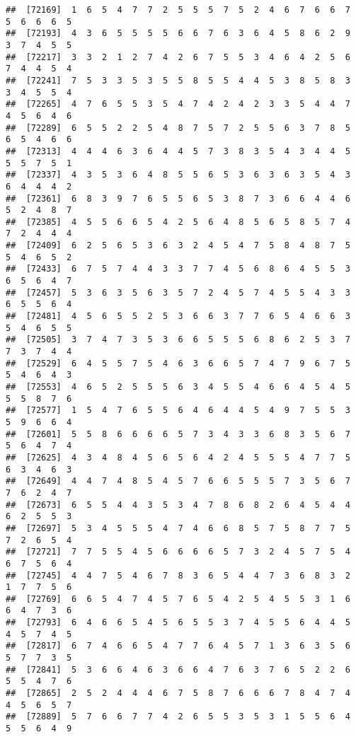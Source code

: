 \documentclass[
]{book}
\begin{document}
\begin{verbatim}
##  [72169]  1  6  5  4  7  7  2  5  5  5  7  5  2  4  6  7  6  6  7  5  6  6  6  5
##  [72193]  4  3  6  5  5  5  5  6  6  7  6  3  6  4  5  8  6  2  9  3  7  4  5  5
##  [72217]  3  3  2  1  2  7  4  2  6  7  5  5  3  4  6  4  2  5  6  7  4  4  5  4
##  [72241]  7  5  3  3  5  3  5  5  8  5  5  4  4  5  3  8  5  8  3  3  4  5  5  4
##  [72265]  4  7  6  5  5  3  5  4  7  4  2  4  2  3  3  5  4  4  7  4  5  6  4  6
##  [72289]  6  5  5  2  2  5  4  8  7  5  7  2  5  5  6  3  7  8  5  6  5  4  6  6
##  [72313]  4  4  4  6  3  6  4  4  5  7  3  8  3  5  4  3  4  4  5  5  5  7  5  1
##  [72337]  4  3  5  3  6  4  8  5  5  6  5  3  6  3  6  3  5  4  3  6  4  4  4  2
##  [72361]  6  8  3  9  7  6  5  5  6  5  3  8  7  3  6  6  4  4  6  5  2  4  8  7
##  [72385]  4  5  5  6  6  5  4  2  5  6  4  8  5  6  5  8  5  7  4  7  2  4  4  4
##  [72409]  6  2  5  6  5  3  6  3  2  4  5  4  7  5  8  4  8  7  5  5  4  6  5  2
##  [72433]  6  7  5  7  4  4  3  3  7  7  4  5  6  8  6  4  5  5  3  6  5  6  4  7
##  [72457]  5  3  6  3  5  6  3  5  7  2  4  5  7  4  5  5  4  3  3  6  5  5  6  4
##  [72481]  4  5  6  5  5  2  5  3  6  6  3  7  7  6  5  4  6  6  3  5  4  6  5  5
##  [72505]  3  7  4  7  3  5  3  6  6  5  5  5  6  8  6  2  5  3  7  7  3  7  4  4
##  [72529]  6  4  5  5  7  5  4  6  3  6  6  5  7  4  7  9  6  7  5  5  4  6  4  3
##  [72553]  4  6  5  2  5  5  5  6  3  4  5  5  4  6  6  4  5  4  5  5  5  8  7  6
##  [72577]  1  5  4  7  6  5  5  6  4  6  4  4  5  4  9  7  5  5  3  5  9  6  6  4
##  [72601]  5  5  8  6  6  6  6  5  7  3  4  3  3  6  8  3  5  6  7  5  6  4  7  4
##  [72625]  4  3  4  8  4  5  6  5  6  4  2  4  5  5  5  4  7  7  5  6  3  4  6  3
##  [72649]  4  4  7  4  8  5  4  5  7  6  6  5  5  5  7  3  5  6  7  7  6  2  4  7
##  [72673]  6  5  5  4  4  3  5  3  4  7  8  6  8  2  6  4  5  4  4  6  2  5  5  3
##  [72697]  5  3  4  5  5  5  4  7  4  6  6  8  5  7  5  8  7  7  5  7  2  6  5  4
##  [72721]  7  7  5  5  4  5  6  6  6  6  5  7  3  2  4  5  7  5  4  6  7  5  6  4
##  [72745]  4  4  7  5  4  6  7  8  3  6  5  4  4  7  3  6  8  3  2  1  7  7  5  6
##  [72769]  6  6  5  4  7  4  5  7  6  5  4  2  5  4  5  5  3  1  6  6  4  7  3  6
##  [72793]  6  4  6  6  5  4  5  6  5  5  3  7  4  5  5  6  4  4  5  4  5  7  4  5
##  [72817]  6  7  4  6  6  5  4  7  7  6  4  5  7  1  3  6  3  5  6  5  7  7  3  5
##  [72841]  5  3  6  6  4  6  3  6  6  4  7  6  3  7  6  5  2  2  6  5  5  4  7  6
##  [72865]  2  5  2  4  4  4  6  7  5  8  7  6  6  6  7  8  4  7  4  4  5  6  5  7
##  [72889]  5  7  6  6  7  7  4  2  6  5  5  3  5  3  1  5  5  6  4  5  5  6  4  9

\end{verbatim}
\end{document}
